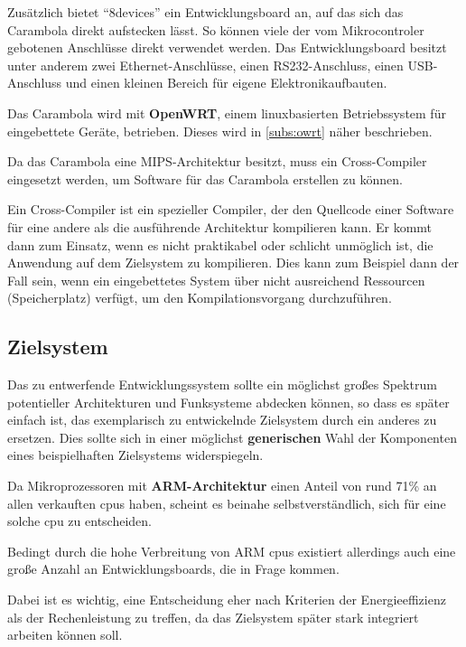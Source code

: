 Zusätzlich bietet "`8devices"' ein Entwicklungsboard an, auf das sich das
Carambola direkt aufstecken lässt. So können viele der vom Mikrocontroler
gebotenen Anschlüsse direkt verwendet werden. Das Entwicklungsboard besitzt
unter anderem zwei Ethernet-Anschlüsse, einen RS232-Anschluss, einen
USB-Anschluss und einen kleinen Bereich für eigene Elektronik\-aufbauten.

Das Carambola wird mit \textbf{OpenWRT}, einem linuxbasierten
Betriebssystem für eingebettete Geräte, betrieben. Dieses wird in
\autoref{subs:owrt} näher beschrieben.

Da das Carambola eine MIPS-Architektur besitzt, muss ein Cross-Compiler
eingesetzt werden, um Software für das Carambola erstellen zu können.
\begin{definition}
Ein Cross-Compiler ist ein spezieller Compiler, der den Quellcode einer
Software für eine andere als die ausführende Architektur kompilieren kann. Er
kommt dann zum Einsatz, wenn es nicht praktikabel oder schlicht unmöglich ist,
die Anwendung auf dem Zielsystem zu kompilieren. Dies kann zum Beispiel dann der
Fall sein, wenn ein eingebettetes System über nicht ausreichend Ressourcen
(Speicherplatz) verfügt, um den Kompilationsvorgang durchzuführen.
\end{definition}

\subsection{Zielsystem}
Das zu entwerfende Entwicklungssystem sollte ein möglichst
großes Spektrum potentieller Architekturen und Funksysteme abdecken können, so
dass es später einfach ist, das exemplarisch zu entwickelnde Zielsystem durch
ein anderes zu ersetzen. Dies sollte sich in einer möglichst
\textbf{generischen} Wahl der Komponenten eines beispielhaften Zielsystems
widerspiegeln.

Da Mikroprozessoren mit \textbf{ARM-Architektur} einen Anteil von rund
71\%\cite{IDC01} an allen verkauften \glspl{cpu} haben, scheint es beinahe
selbstverständlich, sich für eine solche \gls{cpu} zu entscheiden.

Bedingt durch die hohe Verbreitung von ARM \glspl{cpu} existiert allerdings
auch eine große Anzahl an Entwicklungsboards, die in Frage kommen.

Dabei ist es wichtig, eine Entscheidung eher nach Kriterien der Energieeffizienz
als der Rechenleistung zu treffen, da das Zielsystem später stark integriert
arbeiten können soll.

